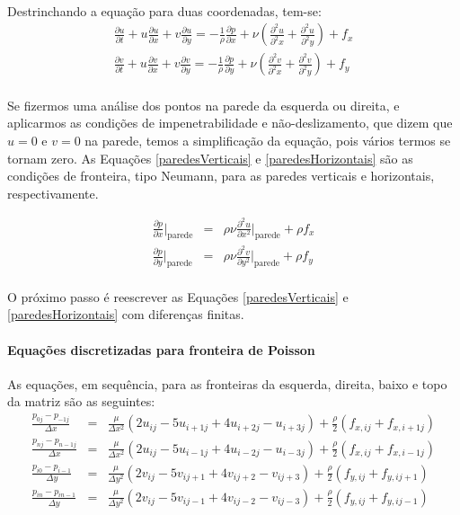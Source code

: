 \documentclass[poisson.tex]{subfiles}
\begin{document}
\paragraph{} Destrinchando a equação para duas coordenadas, tem-se:
\begin{eqnarray}
\frac{\partial u}{\partial t}+u\frac{\partial u}{\partial x}+v\frac{\partial
u}{\partial y}=-\frac{1}{\rho}\frac{\partial p}{\partial
x}+\nu\left(\frac{\partial^2 u}{\partial^2 x}+\frac{\partial^2 u}{\partial^2
y}\right)+f_x\\
\frac{\partial v}{\partial t}+u\frac{\partial v}{\partial x}+v\frac{\partial
v}{\partial y}=-\frac{1}{\rho}\frac{\partial p}{\partial
y}+\nu\left(\frac{\partial^2 v}{\partial^2 x}+\frac{\partial^2 v}{\partial^2
y}\right)+f_y
\end{eqnarray}
\paragraph{} Se fizermos uma análise dos pontos na parede da esquerda ou
direita, e aplicarmos as condições de impenetrabilidade e não-deslizamento, que
dizem que $u=0$ e $v=0$ na parede, temos a simplificação da equação, pois vários
termos se tornam zero. As Equações \ref{paredesVerticais} e \ref{paredesHorizontais} são as condições de fronteira, tipo Neumann, para as paredes verticais e horizontais, respectivamente.

\begin{eqnarray}
\frac{\partial p}{\partial x}\Bigg|_{\textrm{parede}}&=&\rho\nu\frac{\partial^2
u}{\partial x^2}\Bigg|_{\textrm{parede}}+\rho f_x\label{paredesVerticais}\\
\frac{\partial p}{\partial y}\Bigg|_{\textrm{parede}}&=&\rho\nu\frac{\partial^2
v}{\partial y^2}\Bigg|_{\textrm{parede}}+\rho f_y\label{paredesHorizontais}
\end{eqnarray}
\paragraph{} O próximo passo é reescrever as Equações \ref{paredesVerticais}  e \ref{paredesHorizontais} com diferenças finitas. 
\paragraph{Equações discretizadas para fronteira de Poisson} As equações, em
sequência, para as fronteiras da esquerda, direita, baixo e topo da matriz são
as seguintes:
\begin{eqnarray}
\frac{p_{0j}-p_{-1j}}{\Delta x}&=&\frac{\mu}{\Delta x^2}(2u_{ij}-5u_{i+1j}+4u_{i+2j}-u_{i+3j})+\frac{\rho}{2}(f_{x,ij}+f_{x,i+1j}) \label{pressure_01}\\
\frac{p_{nj}-p_{n-1j}}{\Delta x}&=&\frac{\mu}{\Delta x^2}(2u_{ij}-5u_{i-1j}+4u_{i-2j}-u_{i-3j})+\frac{\rho}{2}(f_{x,ij}+f_{x,i-1j})\label{pressure_02}\\
\frac{p_{i0}-p_{i-1}}{\Delta y}&=&\frac{\mu}{\Delta y^2}(2v_{ij}-5v_{ij+1}+4v_{ij+2}-v_{ij+3})+\frac{\rho}{2}(f_{y,ij}+f_{y,ij+1}) \label{pressure_03}\\
\frac{p_{in}-p_{in-1}}{\Delta y}&=&\frac{\mu}{\Delta y^2}(2v_{ij}-5v_{ij-1}+4v_{ij-2}-v_{ij-3})+\frac{\rho}{2}(f_{y,ij}+f_{y,ij-1}) \label{pressure_04}
\end{eqnarray}
\end{document}
